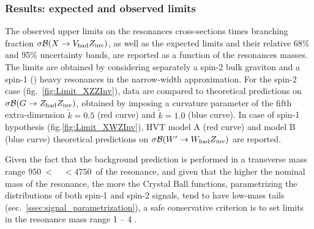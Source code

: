 \clearpage

\subsubsection{Results: expected and observed limits}


The observed upper limits on the resonances cross-sections times branching fraction $\sigma \mathcal{B} (X \rightarrow V_{\text{had}} Z_{\text{inv}})$, as well as the expected limits and their relative 68\% and 95\% uncertainty bands, are reported as a function of the resonances masses. The limits are obtained by considering separately a spin-2 bulk graviton and a spin-1 (\Wp) heavy resonances in the narrow-width approximation. For the spin-2 case (fig.~\ref{fig:Limit_XZZInv}), data are compared to theoretical predictions on $\sigma \mathcal{B} (G \rightarrow Z_{\text{had}} Z_{\text{inv}})$, obtained by imposing a curvature parameter of the fifth extra-dimension $\tilde{k} = 0.5$ (red curve) and $\tilde{k} = 1.0$ (blue curve). In case of spin-1 hypothesis (fig.\ref{fig:Limit_XWZInv}), HVT model A (red curve) and model B (blue curve) theoretical predictions on $\sigma \mathcal{B} (W' \rightarrow W_{\text{had}} Z_{\text{inv}})$ are reported.

\noindent Given the fact that the background prediction is performed in a transverse mass range $950~<$~\mtVZ~$<4750$~\GeV of the resonance, and given that the higher the nominal mass of the resonance, the more the Crystal Ball functions, parametrizing the \mtVZ distributions of both spin-1 and spin-2 signals, tend to have low-mass tails (sec.~\ref{ssec:signal_parametrization}), a safe conservative criterion is to set limits in the resonance mass range 1 \TeV -- 4 \TeV.

